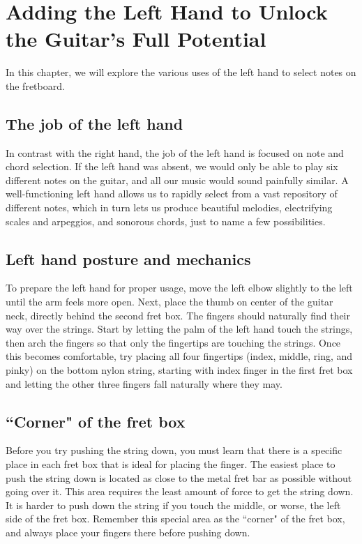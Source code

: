 \chapter[The Left Hand]{Adding the Left Hand to Unlock the Guitar's Full Potential}

In this chapter, we will explore the various uses of the left hand to select notes on the fretboard. 

\section{The job of the left hand}

In contrast with the right hand, the job of the left hand is focused on note and chord selection. If the left hand was absent, we would only be able to play six different notes on the guitar, and all our music would sound painfully similar. A well-functioning left hand allows us to rapidly select from a vast repository of different notes, which in turn lets us produce beautiful melodies, electrifying scales and arpeggios, and sonorous chords, just to name a few possibilities. 

\section{Left hand posture and mechanics}

To prepare the left hand for proper usage, move the left elbow slightly to the left until the arm feels more open. Next, place the thumb on center of the guitar neck, directly behind the second fret box. The fingers should naturally find their way over the strings. Start by letting the palm of the left hand touch the strings, then arch the fingers so that only the fingertips are touching the strings. Once this becomes comfortable, try placing all four fingertips (index, middle, ring, and pinky) on the bottom nylon string, starting with index finger in the first fret box and letting the other three fingers fall naturally where they may. 



\section{``Corner" of the fret box}

Before you try pushing the string down, you must learn that there is a specific place in each fret box that is ideal for placing the finger. The easiest place to push the string down is located as close to the metal fret bar as possible without going over it. This area requires the least amount of force to get the string down. It is harder to push down the string if you touch the middle, or worse, the left side of the fret box. Remember this special area as the ``corner" of the fret box, and always place your fingers there before pushing down. 


